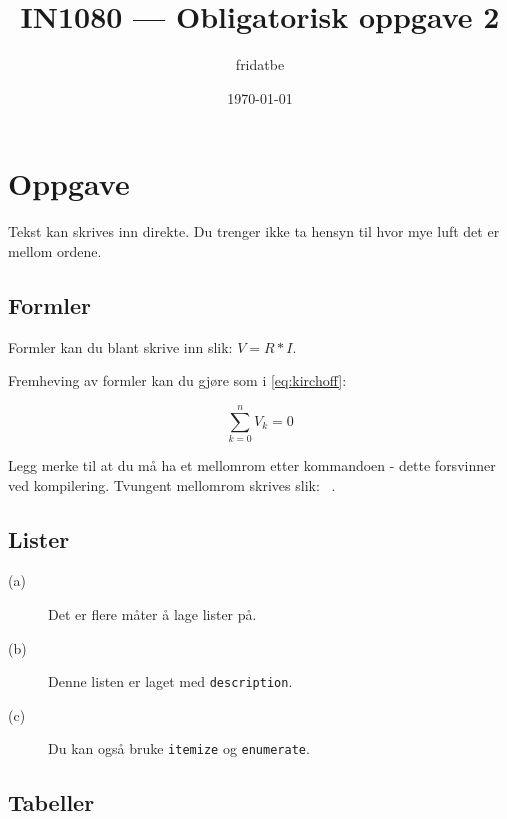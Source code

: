 \documentclass[12pt,norsk,a4paper]{article}
\author{fridatbe}
\title{IN1080 --- Obligatorisk oppgave 2} %
\date{\today}
\begin{document}
    \maketitle

    \renewcommand{\thesubsection}{(\alph{subsection})}

    \section{Oppgave} %

    Tekst kan skrives inn direkte. Du trenger ikke   ta hensyn  til
    hvor mye luft det   er   mellom ordene.

    \subsection*{Formler}

    Formler kan du blant skrive inn slik: $V=R*I$.

    Fremheving av formler kan du gjøre som i \ref{eq:kirchoff}:

    \begin{equation}
        \sum_{k=0}^n V_k = 0
        \label{eq:kirchoff}
    \end{equation}

    Legg merke
    til at du må ha et mellomrom etter kommandoen - dette forsvinner ved
    kompilering. Tvungent mellomrom skrives slik: \ .


    \subsection*{Lister}

    \begin{description}
        \item[(a)] Det er flere måter å lage lister på.
        \item[(b)] Denne listen er laget med {\tt description}.
        \item[(c)] Du kan også bruke {\tt itemize} og {\tt enumerate}.
    \end{description}

    \subsection*{Tabeller}
\end{document}
